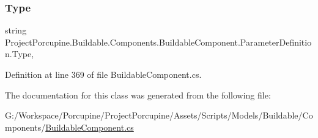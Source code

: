 \subsubsection{\texorpdfstring{Type}{Type}}
{\footnotesize\ttfamily string Project\+Porcupine.\+Buildable.\+Components.\+Buildable\+Component.\+Parameter\+Definition.\+Type\hspace{0.3cm}{\ttfamily [get]}, {\ttfamily [set]}}



Definition at line 369 of file Buildable\+Component.\+cs.



The documentation for this class was generated from the following file\+:\begin{DoxyCompactItemize}
\item 
G\+:/\+Workspace/\+Porcupine/\+Project\+Porcupine/\+Assets/\+Scripts/\+Models/\+Buildable/\+Components/\hyperlink{_buildable_component_8cs}{Buildable\+Component.\+cs}\end{DoxyCompactItemize}

